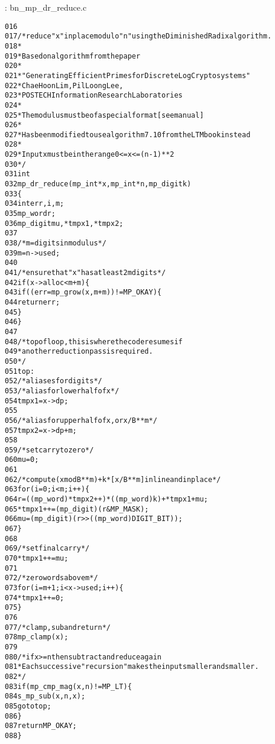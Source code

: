 \documentclass[b5paper]{book}
\begin{document}
\vspace{+3mm}\begin{small}
\hspace{-5.1mm}{\bf File}: bn\_mp\_dr\_reduce.c
\vspace{-3mm}
\begin{alltt}
016   
017   /* reduce "x" in place modulo "n" using the Diminished Radix algorithm.
018    *
019    * Based on algorithm from the paper
020    *
021    * "Generating Efficient Primes for Discrete Log Cryptosystems"
022    *                 Chae Hoon Lim, Pil Loong Lee,
023    *          POSTECH Information Research Laboratories
024    *
025    * The modulus must be of a special format [see manual]
026    *
027    * Has been modified to use algorithm 7.10 from the LTM book instead
028    *
029    * Input x must be in the range 0 <= x <= (n-1)**2
030    */
031   int
032   mp_dr_reduce (mp_int * x, mp_int * n, mp_digit k)
033   \{
034     int      err, i, m;
035     mp_word  r;
036     mp_digit mu, *tmpx1, *tmpx2;
037   
038     /* m = digits in modulus */
039     m = n->used;
040   
041     /* ensure that "x" has at least 2m digits */
042     if (x->alloc < m + m) \{
043       if ((err = mp_grow (x, m + m)) != MP_OKAY) \{
044         return err;
045       \}
046     \}
047   
048   /* top of loop, this is where the code resumes if
049    * another reduction pass is required.
050    */
051   top:
052     /* aliases for digits */
053     /* alias for lower half of x */
054     tmpx1 = x->dp;
055   
056     /* alias for upper half of x, or x/B**m */
057     tmpx2 = x->dp + m;
058   
059     /* set carry to zero */
060     mu = 0;
061   
062     /* compute (x mod B**m) + k * [x/B**m] inline and inplace */
063     for (i = 0; i < m; i++) \{
064         r         = ((mp_word)*tmpx2++) * ((mp_word)k) + *tmpx1 + mu;
065         *tmpx1++  = (mp_digit)(r & MP_MASK);
066         mu        = (mp_digit)(r >> ((mp_word)DIGIT_BIT));
067     \}
068   
069     /* set final carry */
070     *tmpx1++ = mu;
071   
072     /* zero words above m */
073     for (i = m + 1; i < x->used; i++) \{
074         *tmpx1++ = 0;
075     \}
076   
077     /* clamp, sub and return */
078     mp_clamp (x);
079   
080     /* if x >= n then subtract and reduce again
081      * Each successive "recursion" makes the input smaller and smaller.
082      */
083     if (mp_cmp_mag (x, n) != MP_LT) \{
084       s_mp_sub(x, n, x);
085       goto top;
086     \}
087     return MP_OKAY;
088   \}
\end{alltt}
\end{small}
\end{document}
